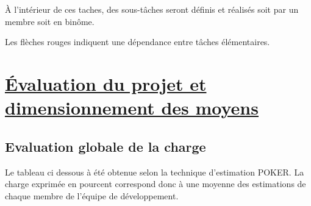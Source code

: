 \documentclass{../res/univ-projet}
\begin{document}
\`{A} l'intérieur de ces taches, des sous-tâches seront définis et réalisés soit par un membre soit en binôme.

Les flèches rouges indiquent une dépendance entre tâches élémentaires.
\newpage
\section{\underline{Évaluation du projet et dimensionnement des moyens}}
\subsection{Evaluation globale de la charge}

Le tableau ci dessous à été obtenue selon la technique d'estimation POKER. La charge exprimée en pourcent correspond donc à une moyenne des estimations de chaque membre 
de l'équipe de développement.
\end{document}
